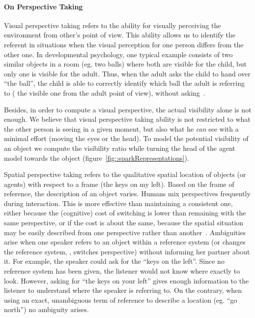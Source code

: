 \paragraph{On Perspective Taking} Visual perspective taking refers to the
ability for visually perceiving the environment from other's point of view.
This ability allows us to identify the referent in situations when the visual
perception for one person differs from the other one. In developmental
psychology, one typical example consists of two similar objects in a room (eg.
two balls) where both are visible for the child, but only one is  visible for
the adult. Thus, when the adult asks the child to hand over ``the ball'', the
child is able to correctly identify which ball the adult is referring to (\ie
the visible one from the adult point of view), without asking~\cite{Moll2006}.

Besides, in order to compute a visual perspective, the actual visibility alone
is not enough. We believe that visual perspective taking ability is not
restricted to what the other person is seeing in a given moment, but also what
he \emph{can} see with a minimal effort (moving the eyes or the head). To model
the potential visibility of an object we compute the visibility ratio while
turning the head of the agent model towards the object
(figure~\ref{fig::sparkRepresentations}).

Spatial perspective taking refers to the qualitative spatial location of
objects (or agents) with respect to a frame (\eg the keys on my left).  Based
on the frame of reference, the description of an object varies. Humans mix
perspectives frequently during interaction.  This is more effective than
maintaining a consistent one, either because the (cognitive) cost of switching
is lower than remaining with the same perspective, or if the cost is about the
same, because the spatial situation may be easily described from one
perspective rather than another~\cite{Tversky1999}. Ambiguities arise when one
speaker refers to an object within a reference system (or changes the reference
system, \ie, switches perspective) without informing her partner about it. For
example, the speaker could ask for the ``keys on the left''. Since no reference
system has been given, the listener would not know where exactly to look.
However, asking for ``the keys on your left'' gives enough information to the
listener to understand where the speaker is referring to. On the
contrary, when using an exact, unambiguous term of reference to describe a
location (eg. ``go north'') no ambiguity arises.

